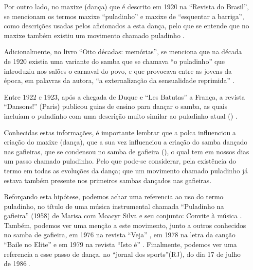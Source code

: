 Por outro lado, no maxixe (dança)  que é descrito em 1920 na ``Revista do Brasil'',
se mencionam os termos maxixe ``puladinho'' e maxixe de ``esquentar a barriga'',
como descrições usadas pelos aficionados a esta dança, 
pelo que se entende que no maxixe também existiu um movimento chamado puladinho \cite[pp. 177]{1920revista}. 

Adicionalmente, no livro ``Oito décadas: memórias'', se menciona que na década de
1920 existia uma variante do samba que se chamava ``o puladinho'' 
que introduziu nos salões o carnaval do povo, 
e que provocava entre as jovens da época, em palavras da autora, 
``a externalização da sensualidade reprimida'' \cite[pp. 94-95]{nabuco2000oito}.

Entre 1922 e 1923, após a chegada de Duque e ``Les Batutas'' a França, 
a revista ``Dansons!'' (Paris) publicou guias de ensino para dançar o samba, %
as quais incluíam o puladinho com uma descrição muito similar ao puladinho atual (\AnoLivro) \cite[pp. 3]{Dansons:15} \cite[pp. 7]{Dansons:25}.

Conhecidas estas informações, é importante lembrar que a polca influenciou a criação do maxixe (dança), 
que a sua vez influenciou a criação do samba dançado nas gafieiras,
que se condensou no samba de gafieira (\AnoLivro), o qual tem em nossos dias um passo chamado puladinho. 
Pelo que pode-se considerar, pela existência do termo em todas as evoluções da dança; 
que um movimento chamado puladinho 
já estava também presente nos primeiros sambas dançados nas gafieiras. 

Reforçando esta hipótese, podemos achar uma referencia ao uso do termo puladinho, no título de uma música instrumental chamada 
``Puladinho na gafieira'' (1958)  de  Marisa com Moacyr Silva e seu conjunto: Convite à música \cite{puladinhogafieiramusic}.
Também, podemos ver uma menção a este movimento, junto a outros conhecidos no samba de gafieira,
em 1976 na revista ``Veja'' \cite[pp. 158]{1976veja},
em 1978 na letra da canção ``Baile no Elite'' \cite{BaileNoElite} e 
em 1979 na revista ``Isto é'' \cite[pp. 89]{revista1979isto}.
Finalmente, podemos ver uma referencia a esse passo de dança, no ``jornal dos sports''(RJ),
do dia 17 de julho de 1986 \cite[pp. 6]{gafieiraaredeout2}.


